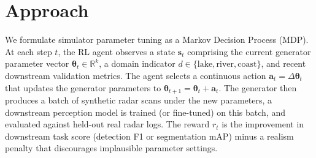 \documentclass[12pt]{article}
\begin{document}
\section{Approach}

We formulate simulator parameter tuning as a Markov Decision Process (MDP). At each step $t$, the RL agent observes a state $\boldsymbol{s}_t$ comprising the current generator parameter vector $\boldsymbol{\theta}_t \in \mathbb{R}^k$, a domain indicator $d \in \{\text{lake}, \text{river}, \text{coast}\}$, and recent downstream validation metrics. The agent selects a continuous action $\boldsymbol{a}_t = \Delta\boldsymbol{\theta}_t$ that updates the generator parameters to $\boldsymbol{\theta}_{t+1} = \boldsymbol{\theta}_t + \boldsymbol{a}_t$. The generator then produces a batch of synthetic radar scans under the new parameters, a downstream perception model is trained (or fine-tuned) on this batch, and evaluated against held-out real radar logs. The reward $r_t$ is the improvement in downstream task score (detection F1 or segmentation mAP) minus a realism penalty that discourages implausible parameter settings.
\end{document}
